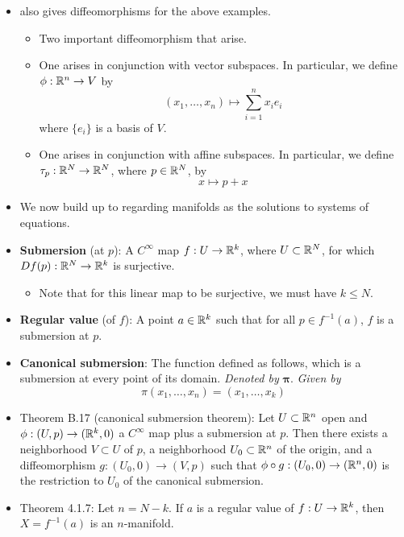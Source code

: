 \documentclass[../notes.tex]{subfiles}
\begin{document}
\begin{itemize}
    \item \textcite{bib:DifferentialForms} also gives diffeomorphisms for the above examples.
    \begin{itemize}
        \item Two important diffeomorphism that arise.
        \item One arises in conjunction with vector subspaces. In particular, we define $\phi:\mathbb{R}^n\to V$ by
        \begin{equation*}
            (x_1,\dots,x_n) \mapsto \sum_{i=1}^nx_ie_i
        \end{equation*}
        where $\{e_i\}$ is a basis of $V$.
        \item One arises in conjunction with affine subspaces. In particular, we define $\tau_p:\mathbb{R}^N\to\mathbb{R}^N$, where $p\in\mathbb{R}^N$, by
        \begin{equation*}
            x \mapsto p+x
        \end{equation*}
    \end{itemize}
    \item We now build up to regarding manifolds as the solutions to systems of equations.
    \item \textbf{Submersion} (at $p$): A $C^\infty$ map $f:U\to\mathbb{R}^k$, where $U\subset\mathbb{R}^N$, for which $Df(p):\mathbb{R}^N\to\mathbb{R}^k$ is surjective.
    \begin{itemize}
        \item Note that for this linear map to be surjective, we must have $k\leq N$.
    \end{itemize}
    \item \textbf{Regular value} (of $f$): A point $a\in\mathbb{R}^k$ such that for all $p\in f^{-1}(a)$, $f$ is a submersion at $p$.
    \item \textbf{Canonical submersion}: The function defined as follows, which is a submersion at every point of its domain. \emph{Denoted by} $\bm{\pi}$. \emph{Given by}
    \begin{equation*}
        \pi(x_1,\dots,x_n) = (x_1,\dots,x_k)
    \end{equation*}
    \item Theorem B.17 (canonical submersion theorem): Let $U\subset\mathbb{R}^n$ open and $\phi:(U,p)\to(\mathbb{R}^k,0)$ a $C^\infty$ map plus a submersion at $p$. Then there exists a neighborhood $V\subset U$ of $p$, a neighborhood $U_0\subset\mathbb{R}^n$ of the origin, and a diffeomorphism $g:(U_0,0)\to(V,p)$ such that $\phi\circ g:(U_0,0)\to(\mathbb{R}^n,0)$ is the restriction to $U_0$ of the canonical submersion.
    \item Theorem 4.1.7: Let $n=N-k$. If $a$ is a regular value of $f:U\to\mathbb{R}^k$, then $X=f^{-1}(a)$ is an $n$-manifold.

\end{itemize}
\end{document}
